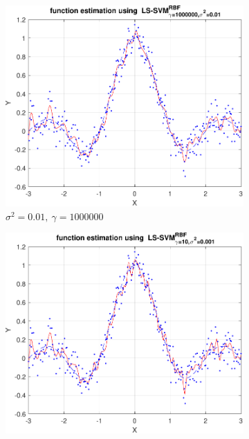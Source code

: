 \documentclass{article}
\begin{document}
            \begin{figure}[h]
                 \centering
                 \hspace{0.05\textwidth}
                 \begin{subfigure}[b]{0.4\textwidth}
                     \centering
                     \includegraphics[width=\textwidth]{Assignment 2/figures/1_2/rbf_reg_sig2_0.01_gam_1000000.00.pdf}
                     \caption{$\sigma^2=0.01,\ \gamma=1000000$}
                     \label{fig:high_gamma}
                 \end{subfigure}
                 \hfill
                 \begin{subfigure}[b]{0.4\textwidth}
                     \centering
                     \includegraphics[width=\textwidth]{Assignment 2/figures/1_2/rbf_reg_sig2_0.00_gam_10.00.pdf}

\end{subfigure}
\end{figure}
\end{document}
